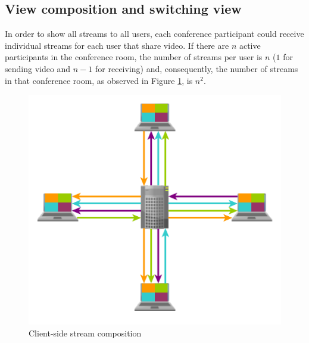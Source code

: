 	\subsection{View composition and switching view}

		In order to show all streams to all users, each conference participant could receive individual streams for each user that share video. If there are $n$ active participants in the conference room, the number of streams per user is $n$ ($1$ for sending video and $n-1$ for receiving) and, consequently, the number of streams in that conference room, as observed in Figure \ref{fig:xcomposite}, is $n^2$.


\begin{figure}
\centering
\begin{minipage}[b]{0.45\linewidth}
	\centering
	\includegraphics[width=\textwidth]{figures/xcomposite.pdf}
		\caption{Client-side stream composition}
	\label{fig:xcomposite}
\end{minipage}
\quad
\begin{minipage}[b]{0.45\linewidth}
	\centering

\end{minipage}
\end{figure}
